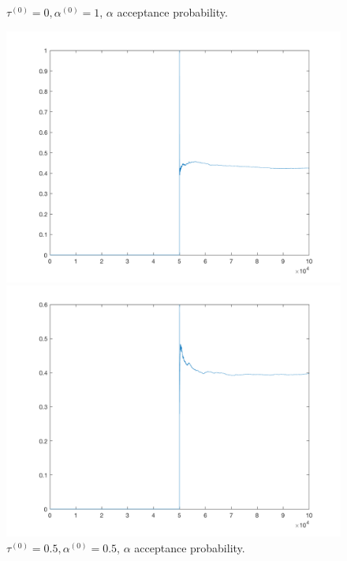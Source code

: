 \documentclass{siamart1116}
\begin{document}
\begin{figure}[!htb]
    \begin{minipage}{0.48\textwidth}
        \centering
        \caption{$\tau^{(0)} = 0, \alpha^{(0)} = 1$, $\alpha$ acceptance probability.}
        \includegraphics[width=\linewidth]{zero_one_alpha_prob.png}
    \end{minipage} \hfill
    \begin{minipage}{0.48\textwidth}
        \centering
        \caption{$\tau^{(0)} = 0.5, \alpha^{(0)} = 0.5$, $\alpha$ acceptance probability.}
        \includegraphics[width=\linewidth]{half_half_alpha_prob.png}
    \end{minipage}
\end{figure}
\end{document}
